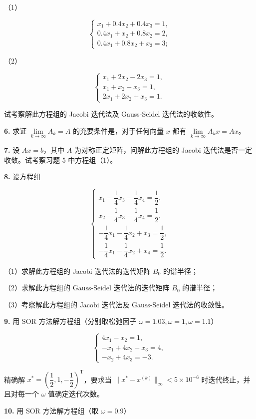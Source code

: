 \documentclass[
  10pt,
  fontset=fandol]{ctexart}
\begin{document}
（1）

\[
\begin{cases}
x_1+0.4x_2+0.4x_3=1,\\
0.4x_1+x_2+0.8x_2=2,\\
0.4x_1+0.8x_2+x_3=3;
\end{cases}
\]

（2）

\[
\begin{cases}
x_1+2x_2-2x_3=1,\\
x_1+x_2+x_3=1,\\
2x_1+2x_2+x_3=1.
\end{cases}
\]

试考察解此方程组的 Jacobi 迭代法及 Gauss-Seidel 迭代法的收敛性。

\textbf{6.} 求证 \(\lim\limits_{k\to\infty}A_k=A\) 的充要条件是，对于任何向量 \(x\) 都有 \(\lim\limits_{k\to\infty}A_kx=Ax\)。

\textbf{7.} 设 \(Ax=b\)，其中 \(A\) 为对称正定矩阵，问解此方程组的 Jacobi 迭代法是否一定收敛。试考察习题 5 中方程组（1）。

\textbf{8.} 设方程组

\[
\begin{cases}
x_1-\dfrac14x_3-\dfrac14x_4=\dfrac12,\\[5pt]
x_2-\dfrac14x_3-\dfrac14x_4=\dfrac12,\\[5pt]
-\dfrac14x_1-\dfrac14x_2+x_3=\dfrac12,\\[5pt]
-\dfrac14x_1-\dfrac14x_2+x_4=\dfrac12.
\end{cases}
\]

（1）求解此方程组的 Jacobi 迭代法的迭代矩阵 \(B_0\) 的谱半径；

（2）求解此方程组的 Gauss-Seidel 迭代法的迭代矩阵 \(B_0\) 的谱半径；

（3）考察解此方程组的 Jacobi 迭代法及 Gauss-Seidel 迭代法的收敛性。

\textbf{9.} 用 SOR 方法解方程组（分别取松弛因子 \(\omega=1.03,\omega=1,\omega=1.1\)）

\[
\begin{cases}
4x_1-x_2=1,\\
-x_1+4x_2-x_3=4,\\
-x_2+4x_3=-3.
\end{cases}
\]

精确解 \(x^*=\left(\dfrac12,1,-\dfrac12\right)^{\mathrm T}\)，要求当 \(\|x^*-x^{(k)}\|_\infty<5\times10^{-6}\) 时迭代终止，并且对每一个 \(\omega\) 值确定迭代次数。

\textbf{10.} 用 SOR 方法解方程组（取 \(\omega=0.9\)）
\end{document}
